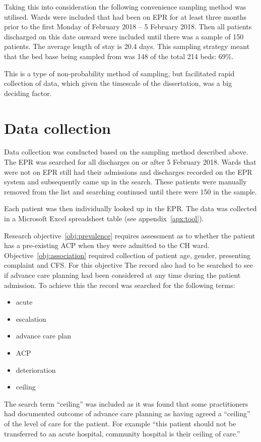 \documentclass
[
	12pt,
	a4paper,
	oneside,
]{report}
\begin{document}
Taking this into consideration the following convenience sampling method was 
utilised. Wards were included that had been on EPR for at least three months
prior to the first Monday of February 2018 -- 5 February 2018. Then all patients
discharged on this date onward were included until there was a sample of 150
patients. The average length of stay is 20.4 days. This sampling strategy 
meant that the bed base being sampled from was 148 of the total 214 beds: 69\%.

This is a type of non-probability method of sampling, but facilitated rapid
collection of data, which given the timescale of the dissertation, was a big
deciding factor.

\section{Data collection}

Data collection was conducted based on the sampling method described above.
The EPR was searched for all discharges on or after 5 February 2018. Wards
that were not on EPR still had their admissions and discharges recorded on the
EPR system and subsequently came up in the search. These patients were 
manually removed from the list and searching continued until there were 150
in the sample.

Each patient was then individually looked up in the EPR. The data was
collected in a Microsoft Excel spreadsheet table (see appendix~\ref{apx:tool}).

Research objective~\ref{obj:prevalence} requires assessment as to whether the 
patient has a pre-existing ACP when they were admitted to the CH ward. 
Objective~\ref{obj:association} required collection of patient age, gender,
presenting complaint and CFS.  
For this objective The record also had to be searched to see if advance care
planning had been considered at any time during the patient admission. To 
achieve this the record was searched for the following terms:

\begin{itemize}
\item acute
\item escalation
\item advance care plan
\item ACP
\item deterioration
\item ceiling
\end{itemize}

The search term ``ceiling'' was included as it was found that some practitioners
had documented outcome of advance care planning as having agreed a ``ceiling'' 
of the level of care for the patient. For example ``this patient should not be
transferred to an acute hospital, community hospital is their ceiling of care.''
\end{document}
